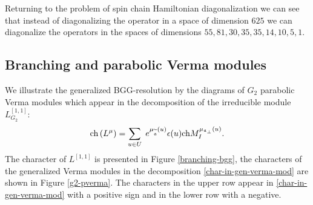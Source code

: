 \documentclass[preprint,12pt]{elsarticle}
\newcommand{\aft}{\widetilde{\mathfrak{a}}}
\begin{document}
Returning to the problem of spin chain Hamiltonian diagonalization we can see that instead of diagonalizing the operator in a space of dimension $625$ we can diagonalize the operators in the spaces of dimensions $55, 81, 30, 35, 35, 14, 10, 5, 1$.

\subsection{Branching and parabolic Verma modules}
\label{sec:branch-parab-verma}

We illustrate the generalized BGG-resolution by the diagrams of $G_{2}$ parabolic Verma modules which appear in the decomposition of the irreducible module $L^{[1,1]}_{G_{2}}$:
\begin{equation}
\mathrm{ch}\left( L^{\mu }\right) =\sum_{u\in U}\;e^{\mu _{\aft}\left(
u\right) }\epsilon (u)\mathrm{ch}M_{I}^{\mu _{\frak{a}_{\perp }}\left(
u\right) }.  \label{char-in-gen-verma-mod}
\end{equation}
The character of $L^{[1,1]}$ is presented in Figure \ref{branching-bgg}, the characters of the generalized Verma modules in the decomposition \eqref{char-in-gen-verma-mod} are shown in Figure \ref{g2-pverma}. The characters in the upper row appear in \eqref{char-in-gen-verma-mod} with a positive sign and in the lower row with a negative.
\end{document}
